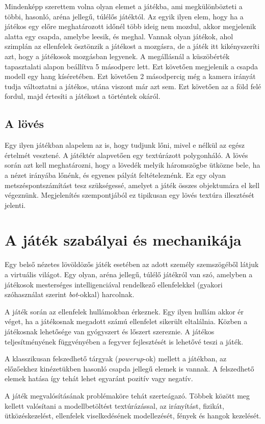 Mindenképp szerettem volna olyan elemet a játékba, ami megkülönbözteti a többi, hasonló, aréna jellegű, túlélős játéktól. Az egyik ilyen elem, hogy ha a játékos egy előre meghatározott időnél több ideig nem mozdul, akkor megjelenik alatta egy csapda, amelybe leesik, és meghal. Vannak olyan játékok, ahol szimplán az ellenfelek ösztönzik a játékost a mozgásra, de a játék itt kikényszeríti azt, hogy a játékosok mozgásban legyenek. A megállásnál a küszöbérték tapasztalati alapon beállítva 5 másodperc lett. Ezt követően megjelenik a csapda modell egy hang kíséretében. Ezt követően 2 másodpercig még a kamera irányát tudja változtatni a játékos, utána viszont már azt sem. Ezt követően az a föld felé fordul, majd értesíti a játékost a történtek okáról.

\subsection{A lövés}

Egy ilyen játékban alapelem az is, hogy tudjunk lőni, mivel e nélkül az egész értelmét vesztené. A játéktér alapvetően egy textúrázott polygonháló. A lövés során azt kell meghatározni, hogy a lövedék melyik háromszögbe ütközne bele, ha a nézet irányába lőnénk, és egyenes pályát feltételeznénk. Ez egy olyan metszéspontszámítást tesz szükségessé, amelyet a játék összes objektumára el kell végeznünk. Megjelenítés szempontjából ez tipikusan egy lövés textúra illesztését jelenti.


\section{A játék szabályai és mechanikája}

Egy belső nézetes lövöldözős játék esetében az adott személy szemszögéből látjuk a virtuális világot. Egy olyan, aréna jellegű, túlélő játékról van szó, amelyben a játékosok mesterséges intelligenciával rendelkező ellenfelekkel (gyakori szóhasználat szerint \textit{bot}-okkal) harcolnak.

A játék során az ellenfelek hullámokban érkeznek. Egy ilyen hullám akkor ér véget, ha a játékosnak megadott számú ellenfelet sikerült eltalálnia. Közben a játékosnak lehetősége van gyógyszert és lőszert szereznie. A játékos teljesítményének függvényében a fegyver fejlesztését is lehetővé teszi a játék.

A klasszikusan felszedhető tárgyak (\textit{powerup}-ok) mellett a játékban, az előzőekhez kinézetükben hasonló csapda jellegű elemek is vannak. A felszedhető elemek hatása így tehát lehet egyaránt pozitív vagy negatív.

A játék megvalósításának problémaköre tehát szerteágazó. Többek között meg kellett valósítani a modellbetöltést textúrázással, az irányítást, fizikát, ütközéskezelést, ellenfelek viselkedésének modellezését, fények és hangok kezelését.

